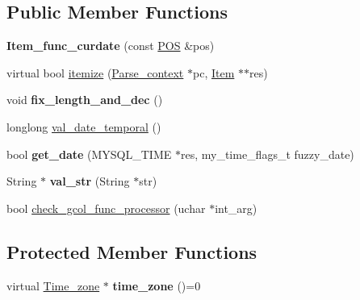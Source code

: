 \subsection*{Public Member Functions}
\begin{DoxyCompactItemize}
\item 
\mbox{\label{classItem__func__curdate_ad4c314cfdd15b115734191560d024213}} 
{\bfseries Item\+\_\+func\+\_\+curdate} (const \mbox{\hyperlink{structYYLTYPE}{P\+OS}} \&pos)
\item 
virtual bool \mbox{\hyperlink{classItem__func__curdate_a9c3b90cb34f741de0795ca7908377ce0}{itemize}} (\mbox{\hyperlink{structParse__context}{Parse\+\_\+context}} $\ast$pc, \mbox{\hyperlink{classItem}{Item}} $\ast$$\ast$res)
\item 
\mbox{\label{classItem__func__curdate_abcd848b46a1c8c55359f20789aea1174}} 
void {\bfseries fix\+\_\+length\+\_\+and\+\_\+dec} ()
\item 
longlong \mbox{\hyperlink{classItem__func__curdate_aa8961163e017b6d68c26df334cd9c0b6}{val\+\_\+date\+\_\+temporal}} ()
\item 
\mbox{\label{classItem__func__curdate_a009b480a69dded234fa02bdad9414876}} 
bool {\bfseries get\+\_\+date} (M\+Y\+S\+Q\+L\+\_\+\+T\+I\+ME $\ast$res, my\+\_\+time\+\_\+flags\+\_\+t fuzzy\+\_\+date)
\item 
\mbox{\label{classItem__func__curdate_ad88bf6ea41b0256a5ccb6d431aad7972}} 
String $\ast$ {\bfseries val\+\_\+str} (String $\ast$str)
\item 
bool \mbox{\hyperlink{classItem__func__curdate_abdf88efdcbd4bf821e4577dcd7765bb9}{check\+\_\+gcol\+\_\+func\+\_\+processor}} (uchar $\ast$int\+\_\+arg)
\end{DoxyCompactItemize}
\subsection*{Protected Member Functions}
\begin{DoxyCompactItemize}
\item 
\mbox{\label{classItem__func__curdate_aa1ebf2817018e18b6286fd8dc4801999}} 
virtual \mbox{\hyperlink{classTime__zone}{Time\+\_\+zone}} $\ast$ {\bfseries time\+\_\+zone} ()=0
\end{DoxyCompactItemize}

